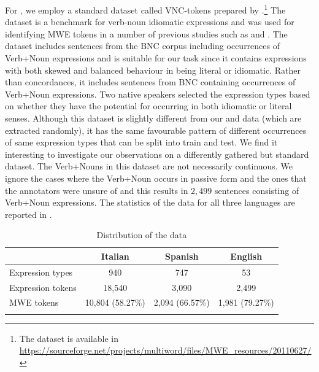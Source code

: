 \documentclass[output=paper
,modfonts
,nonflat]{langsci/langscibook}
\begin{document}
For , we employ a standard dataset called VNC-tokens prepared by \cite{cook2008vnc}.\footnote{The dataset is available in \url{https://sourceforge.net/projects/multiword/files/MWE_resources/20110627/}} The dataset is a benchmark for  verb-noun idiomatic expressions and was used for identifying MWE tokens in a number of previous studies such as \cite{fazly-cook-stevenson:2009:CL} and \cite{salton2016acl}.
The dataset includes sentences from the BNC corpus including occurrences of Verb+Noun expressions and is suitable for our task since it contains expressions with both skewed and balanced behaviour in being literal or idiomatic. 
Rather than concordances, it includes sentences from BNC containing occurrences of Verb+Noun expressions.
Two  native speakers selected the expression types based on whether they have the potential for occurring in both idiomatic or literal senses. Although this dataset is slightly different from our  and  data (which are extracted randomly), it has the same favourable pattern of different occurrences of same expression types that can be split into train and test. We find it interesting to investigate our observations on a differently gathered but standard dataset. 
The Verb+Nouns in this dataset are not necessarily continuous.
We ignore the cases where the Verb+Noun occurs in passive form and the ones that the annotators were unsure of and this results in $2,499$ sentences consisting of Verb+Noun expressions. The statistics of the data for all three languages are reported in .

\begin{table}[!ht]
\small
\caption{Distribution of the data}
\label{tab:data}
 \begin{tabular}{lccc} 
  \lsptoprule
    & Italian & Spanish & English  \\
  \midrule
   Expression types & 940 & 747 & 53 \\
   Expression tokens & 18,540 & 3,090 & 2,499  \\
   MWE tokens  & 10,804 (58.27\%) & 2,094 (66.57\%) & 1,981 (79.27\%)  \\
  \lspbottomrule
 \end{tabular}
\end{table}
\end{document}
